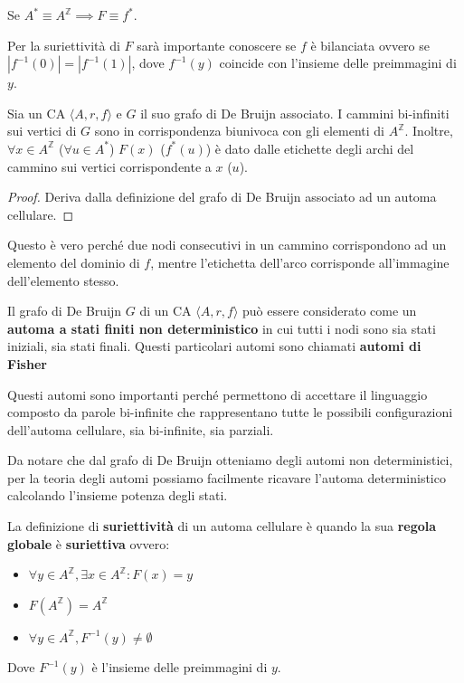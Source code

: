 \begin{nota}
    Se $A^\ast\equiv A^\mathbb{Z}\implies F \equiv f^\ast$.
\end{nota}

\begin{nota}
    Per la suriettività di $F$ sarà importante conoscere se $f$ è bilanciata ovvero
    se $|f^{-1}(0)| =|f^{-1}(1)|$, dove $  f^{-1}(y)$ coincide con l'insieme delle
    preimmagini di $y$.
\end{nota}

\begin{nota}
    Sia un CA $\langle A,r,f\rangle$ e $G$ il suo grafo di De Bruijn associato.
    I cammini bi-infiniti sui vertici di $G$ sono in corrispondenza biunivoca
    con gli elementi di $A^\mathbb{Z}$. Inoltre, $\forall x\in A^\mathbb{Z}$ ($ \forall u\in A^\ast$)
    $F(x)$ ($f^\ast(u)$) è dato dalle etichette degli archi del cammino sui vertici
    corrispondente a $x$ ($u$).
    \begin{proof}
        Deriva dalla definizione del grafo di De Bruijn associato ad un automa cellulare.
    \end{proof}
\end{nota}

Questo è vero perché due nodi consecutivi in un cammino corrispondono ad un elemento
del dominio di $f$, mentre l'etichetta dell'arco corrisponde all'immagine dell'elemento
stesso.

\begin{nota}
    Il grafo di De Bruijn $G$ di un CA $\langle A,r,f\rangle$ può essere considerato
    come un \textbf{automa a stati finiti non deterministico} in cui tutti i nodi sono sia stati iniziali, sia
    stati finali. Questi particolari automi sono chiamati \textbf{automi di Fisher}
\end{nota}

Questi automi sono importanti perché permettono di accettare il linguaggio composto
da parole bi-infinite che rappresentano tutte le possibili configurazioni dell'automa
cellulare, sia bi-infinite, sia parziali.

Da notare che dal grafo di De Bruijn otteniamo degli automi non deterministici,
per la teoria degli automi possiamo facilmente ricavare l'automa deterministico
calcolando l'insieme potenza degli stati.

\begin{definizione} 
    La definizione di \textbf{suriettività} di un automa cellulare è quando la sua
    \textbf{regola globale} è \textbf{suriettiva} ovvero:
    \begin{itemize}
        \item $\forall y\in A^\mathbb{Z},\exists x\in A^\mathbb{Z}: F(x) = y$
        \item $F(A^\mathbb{Z}) = A^\mathbb{Z}$
        \item $\forall y \in A^\mathbb{Z}, F^{-1}(y) \ne \emptyset $
    \end{itemize}
    Dove $F^{-1}(y)$ è l'insieme delle preimmagini di $y$.
\end{definizione}

